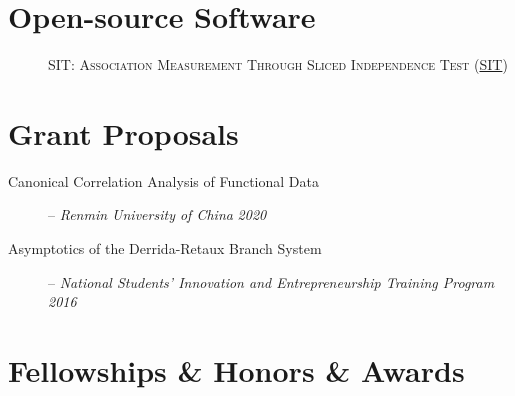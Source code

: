 \documentclass[margin,line]{resume-bib}
\begin{document}
\begin{resume}


\section{\mysidestyle Open-source Software}\vspace{3mm}  


\begin{description}
    \item[]  \textsc{SIT: Association Measurement Through Sliced Independence Test} (\href{https://cran.r-project.org/web/packages/SIT/}{SIT}) 
\end{description}

\section{\mysidestyle Grant Proposals}\vspace{1mm}
\begin{description}
    \item[Canonical Correlation Analysis of Functional Data] -- {\it Renmin University of China}  \hfill \textsl{2020} 
    \item[Asymptotics of the Derrida-Retaux Branch System] -- \textit{National Students' Innovation and Entrepreneurship Training Program} \hfill \textsl{2016} 
\end{description}

\section{\mysidestyle Fellowships {\footnotesize \&} Honors  {\footnotesize \&} Awards}\vspace{1mm}	


\end{resume}
\end{document}
